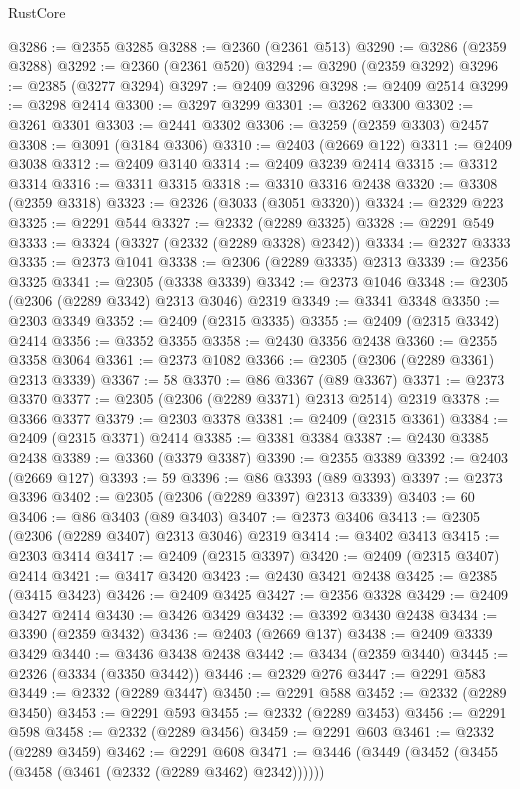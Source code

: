 \begin{lexlean}{RustCore}
\begin{coremodule}
@3286 := @2355 @3285
@3288 := @2360 (@2361 @513)
@3290 := @3286 (@2359 @3288)
@3292 := @2360 (@2361 @520)
@3294 := @3290 (@2359 @3292)
@3296 := @2385 (@3277 @3294)
@3297 := @2409 @3296
@3298 := @2409 @2514
@3299 := @3298 @2414
@3300 := @3297 @3299
@3301 := @3262 @3300
@3302 := @3261 @3301
@3303 := @2441 @3302
@3306 := @3259 (@2359 @3303) @2457
@3308 := @3091 (@3184 @3306)
@3310 := @2403 (@2669 @122)
@3311 := @2409 @3038
@3312 := @2409 @3140
@3314 := @2409 @3239 @2414
@3315 := @3312 @3314
@3316 := @3311 @3315
@3318 := @3310 @3316 @2438
@3320 := @3308 (@2359 @3318)
@3323 := @2326 (@3033 (@3051 @3320))
@3324 := @2329 @223
@3325 := @2291 @544
@3327 := @2332 (@2289 @3325)
@3328 := @2291 @549
@3333 := @3324 (@3327 (@2332 (@2289 @3328) @2342))
@3334 := @2327 @3333
@3335 := @2373 @1041
@3338 := @2306 (@2289 @3335) @2313
@3339 := @2356 @3325
@3341 := @2305 (@3338 @3339)
@3342 := @2373 @1046
@3348 := @2305 (@2306 (@2289 @3342) @2313 @3046) @2319
@3349 := @3341 @3348
@3350 := @2303 @3349
@3352 := @2409 (@2315 @3335)
@3355 := @2409 (@2315 @3342) @2414
@3356 := @3352 @3355
@3358 := @2430 @3356 @2438
@3360 := @2355 @3358 @3064
@3361 := @2373 @1082
@3366 := @2305 (@2306 (@2289 @3361) @2313 @3339)
@3367 := 58
@3370 := @86 @3367 (@89 @3367)
@3371 := @2373 @3370
@3377 := @2305 (@2306 (@2289 @3371) @2313 @2514) @2319
@3378 := @3366 @3377
@3379 := @2303 @3378
@3381 := @2409 (@2315 @3361)
@3384 := @2409 (@2315 @3371) @2414
@3385 := @3381 @3384
@3387 := @2430 @3385 @2438
@3389 := @3360 (@3379 @3387)
@3390 := @2355 @3389
@3392 := @2403 (@2669 @127)
@3393 := 59
@3396 := @86 @3393 (@89 @3393)
@3397 := @2373 @3396
@3402 := @2305 (@2306 (@2289 @3397) @2313 @3339)
@3403 := 60
@3406 := @86 @3403 (@89 @3403)
@3407 := @2373 @3406
@3413 := @2305 (@2306 (@2289 @3407) @2313 @3046) @2319
@3414 := @3402 @3413
@3415 := @2303 @3414
@3417 := @2409 (@2315 @3397)
@3420 := @2409 (@2315 @3407) @2414
@3421 := @3417 @3420
@3423 := @2430 @3421 @2438
@3425 := @2385 (@3415 @3423)
@3426 := @2409 @3425
@3427 := @2356 @3328
@3429 := @2409 @3427 @2414
@3430 := @3426 @3429
@3432 := @3392 @3430 @2438
@3434 := @3390 (@2359 @3432)
@3436 := @2403 (@2669 @137)
@3438 := @2409 @3339 @3429
@3440 := @3436 @3438 @2438
@3442 := @3434 (@2359 @3440)
@3445 := @2326 (@3334 (@3350 @3442))
@3446 := @2329 @276
@3447 := @2291 @583
@3449 := @2332 (@2289 @3447)
@3450 := @2291 @588
@3452 := @2332 (@2289 @3450)
@3453 := @2291 @593
@3455 := @2332 (@2289 @3453)
@3456 := @2291 @598
@3458 := @2332 (@2289 @3456)
@3459 := @2291 @603
@3461 := @2332 (@2289 @3459)
@3462 := @2291 @608
@3471 := @3446 (@3449 (@3452 (@3455 (@3458 (@3461 (@2332 (@2289 @3462) @2342))))))

\end{coremodule}
\end{lexlean}

